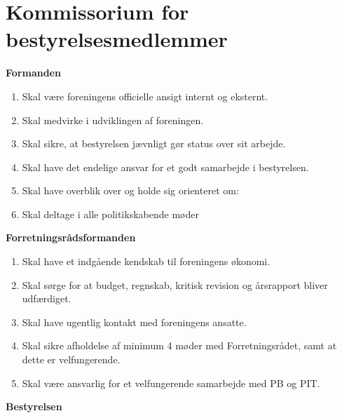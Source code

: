\section{Kommissorium for bestyrelsesmedlemmer}
\textbf{Formanden}
\begin{enumerate}
\item  Skal være foreningens officielle ansigt internt og eksternt.
\item Skal medvirke i udviklingen af foreningen.
\item Skal sikre, at bestyrelsen jævnligt gør status over sit arbejde.
\item Skal have det endelige ansvar for et godt samarbejde i bestyrelsen.
\item Skal have overblik over og holde sig orienteret om:
\item Skal deltage i alle politikskabende møder
\end{enumerate}

\textbf{Forretningsrådsformanden}
\begin{enumerate}
\item Skal have et indgående kendskab til foreningens økonomi.
\item Skal sørge for at budget, regnskab, kritisk revision og årsrapport bliver udfærdiget.
\item Skal have ugentlig kontakt med foreningens ansatte.
\item Skal sikre afholdelse af minimum 4 møder med Forretningsrådet, samt at dette er velfungerende.
\item Skal være ansvarlig for et velfungerende samarbejde med PB og PIT. 
\end{enumerate}
\textbf{Bestyrelsen}

